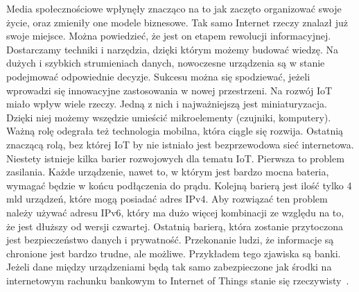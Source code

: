 \documentclass[brudnopis]{xmgr}
\begin{document}
Media społecznościowe wpłynęły znacząco na to jak zaczęto organizować swoje życie, oraz zmieniły one modele biznesowe. Tak samo Internet rzeczy znalazł już swoje miejsce. Można powiedzieć, że jest on etapem rewolucji informacyjnej. Dostarczamy techniki i narzędzia, dzięki którym możemy budować wiedzę. Na dużych i szybkich strumieniach danych, nowoczesne urządzenia są w stanie podejmować odpowiednie decyzje. Sukcesu można się spodziewać, jeżeli wprowadzi się innowacyjne zastosowania w nowej przestrzeni. 
Na rozwój IoT miało wpływ wiele rzeczy. Jedną z nich i najważniejszą jest miniaturyzacja. Dzięki niej możemy wszędzie umieścić mikroelementy (czujniki, komputery). Ważną rolę odegrała też technologia mobilna, która ciągle się rozwija. Ostatnią znaczącą rolą, bez której IoT by nie istniało jest bezprzewodowa sieć internetowa. 
Niestety istnieje kilka barier rozwojowych dla tematu IoT. Pierwsza to problem zasilania. Każde urządzenie, nawet to, w którym jest bardzo mocna bateria, wymagać będzie w końcu podłączenia do prądu. Kolejną barierą jest ilość tylko 4 mld urządzeń, które mogą posiadać adres IPv4. Aby rozwiązać ten problem należy używać adresu IPv6, który ma dużo więcej kombinacji ze względu na to, że jest dłuższy od wersji czwartej. Ostatnią barierą, która zostanie przytoczona jest bezpieczeństwo danych i prywatność. Przekonanie ludzi, że informacje są chronione jest bardzo trudne, ale możliwe. Przykładem tego zjawiska są banki. Jeżeli dane między urządzeniami będą tak samo zabezpieczone jak środki na internetowym rachunku bankowym to Internet of Things stanie się rzeczywisty~\cite{KeyApplications}.
\end{document}
